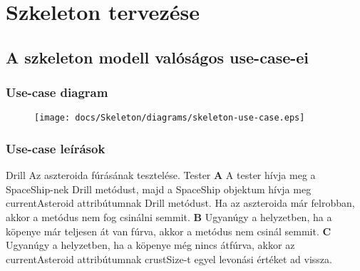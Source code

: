\documentclass[../../projlab]{subfiles}
\begin{document}
\makeatletter


\makeatother

\chapter{Szkeleton tervezése}


\section{A szkeleton modell valóságos use-case-ei}

\subsection{Use-case diagram}
\begin{figure}[H] 
    \centering 
    \texttt{[image: docs/Skeleton/diagrams/skeleton-use-case.eps]} 
    \caption{} 
\end{figure} 

\subsection{Use-case leírások}
\begin{use-case}
    {Drill}
    {Az aszteroida fúrásának tesztelése.}
    {Tester} 
    \textbf{A} A tester hívja meg a SpaceShip-nek Drill metódust, majd a SpaceShip objektum hívja meg currentAsteroid attribútumnak Drill metódust. Ha az aszteroida már felrobban, akkor a metódus nem fog csinálni semmit. \newline
    \textbf{B} Ugyanúgy a helyzetben, ha a köpenye már teljesen át van fúrva, akkor a metódus nem csinál semmit. \newline
    \textbf{C} Ugyanúgy a helyzetben, ha a köpenye még nincs átfúrva, akkor az currentAsteroid attribútumnak crustSize-t egyel levonási értéket ad vissza. \newline
\end{use-case}
\end{document}
